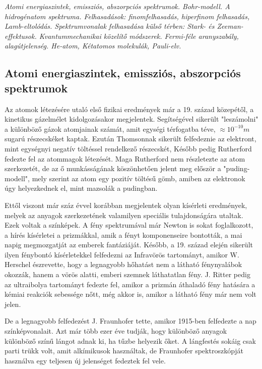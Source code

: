 \documentclass[../main.tex]{subfiles}
\begin{document}
\textit{Atomi energiaszintek, emissziós, abszorpciós spektrumok. Bohr-modell. A hidrogénatom spektruma. Felhasadások: finomfelhasadás, hiperfinom felhasadás, Lamb-eltolódás.
Spektrumvonalak felhasadása külső térben: Stark- és Zeeman-effektusok. Kvantummechanikai közelítő módszerek. Fermi-féle aranyszabály, alagútjelenség. He-atom, Kétatomos molekulák, Pauli-elv.}

\subsection{Atomi energiaszintek, emissziós, abszorpciós spektrumok \cite{kiserleti_atomfizika}}
Az atomok létezésére utaló első fizikai eredmények már a 19. század közepétől, a kinetikus gázelmélet kidolgozásakor megjelentek. Segítségével sikerült "leszámolni" a különböző gázok
atomjainak számát, amit egységi térfogatba téve, $\approx 10^{-10}m$ sugarú részecskéket kaptak. Ezután Thomsonnak sikerült felfedeznie az elektront, mint egységnyi negatív töltéssel rendelkező részecskét,
Később pedig Rutherford fedezte fel az atommagok létezését. Maga Rutherford nem részletezte az atom szerkezetét, de az ő munkásságának köszönhetően jelent meg először a "puding-modell", mely szerint az atom egy pozitív töltésű gömb,
amiben az elektronok úgy helyezkednek el, mint mazsolák a pudingban.

Ettől viszont már száz évvel korábban megjelentek olyan kísérleti eredmények, melyek az anyagok szerkezetének valamilyen speciális tulajdonságára utaltak. Ezek voltak a színképek.
A fény spektrumával már Newton is sokat foglalkozott, a hírés kísérletei a prizmákkal, amik a fényt komponenseire bontották, a mai napig megmozgatját az emberek fantáziáját.
Később, a 19. század elején sikerült ilyen fénybontó kísérletekkel felfedezni az Infravörös tartományt, amikor W. Herschel észrevette, hogy a legnagyobb hőhatást nem a látható fénynyalábok
okozzák, hanem a vörös alatti, emberi szemnek láthatatlan fény. J. Ritter pedig az ultraibolya tartományt fedezte fel, amikor a prizmán áthaladó fény hatására a kémiai reakciók sebessége
nőtt, még akkor is, amikor a látható fény már nem volt jelen.

De a legnagyobb felfedezést J. Fraunhofer tette, amikor 1915-ben felfedezte a nap színképvonalait. Azt már több ezer éve tudják, hogy különböző anyagok különböző színű lángot adnak ki, ha tűzbe helyezik őket.
A lángfestés sokáig csak parti trükk volt, amit alkímikusok használtak, de Fraunhofer spektroszkópját használva egy teljesen új jelenséget fedeztek fel vele. 
\end{document}
